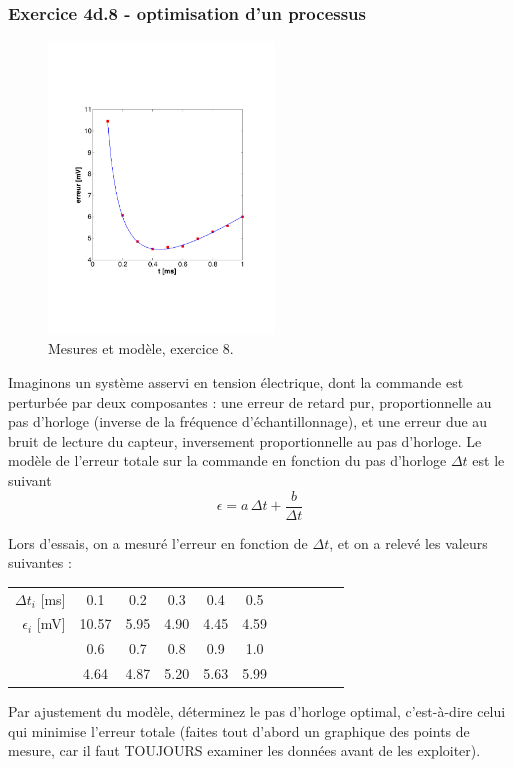 \documentclass[main.tex]{subfiles}
\begin{document}
\subsubsection*{Exercice 4d.8 - optimisation d'un processus}

\begin{figure}
    \centering
    \vspace{-5mm}
    \includegraphics[width=6cm]{assets/figures/exe9fig1serie2.pdf}
    \caption{Mesures et modèle, exercice 8.}
    \label{fig:exe9}
\end{figure}
Imaginons un système asservi en tension électrique, dont la commande est perturbée par deux composantes : une erreur de retard pur, proportionnelle au pas d'horloge (inverse de la fréquence d'échantillonnage), et une erreur due au bruit de lecture du capteur, inversement proportionnelle au pas d'horloge. Le modèle de l'erreur totale sur la commande en fonction du pas d'horloge $\Delta t$ est le suivant
$$
    \epsilon=a\,\Delta t+\frac{b}{\Delta t}
$$
\newline
\newline
\newline
\newline
\newline

Lors d'essais, on a mesuré l'erreur en fonction de $\Delta t$, et on a relevé les valeurs suivantes :
\begin{center}
    \hspace{6cm}\begin{tabular}{r|cccccccccc}
        $\Delta t_i$ [ms] & 0.1   & 0.2  & 0.3  & 0.4  & 0.5  \\
        $\epsilon_i$ [mV] & 10.57 & 5.95 & 4.90 & 4.45 & 4.59 \\
                          & 0.6   & 0.7  & 0.8  & 0.9  & 1.0  \\
                          & 4.64  & 4.87 & 5.20 & 5.63 & 5.99
    \end{tabular}
\end{center}

Par ajustement du modèle, déterminez le pas d'horloge optimal, c'est-à-dire celui qui minimise l'erreur totale (faites tout d'abord un graphique des points de mesure, car il faut TOUJOURS examiner les données avant de les exploiter).

\fi
\end{document}
